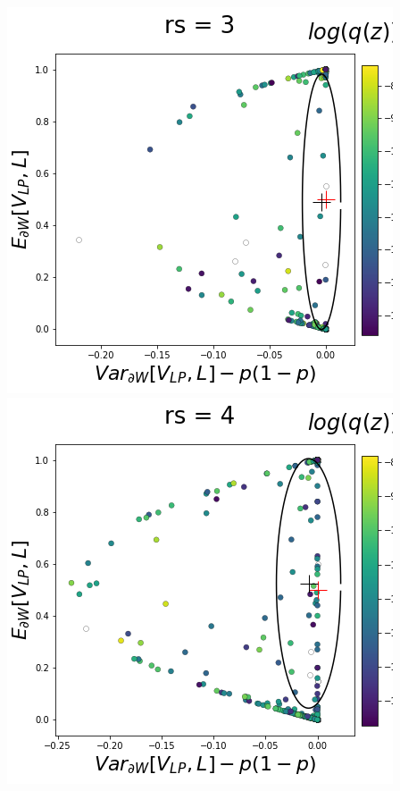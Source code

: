 \documentclass[11pt]{article}
\begin{document}
\begin{center}
\includegraphics[scale=0.33]{figs/T_x_SC_full_c=0_p=50_rs=3.png} \\
\includegraphics[scale=0.33]{figs/T_x_SC_full_c=0_p=50_rs=4.png}

\end{center}
\end{document}
